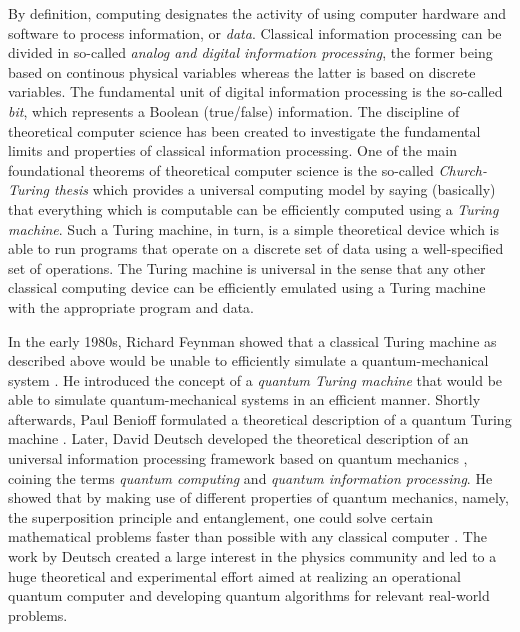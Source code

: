 By definition, computing designates the activity of using computer hardware and software to process information, or {\it data}. Classical information processing can be divided in so-called {\it analog and digital information processing}, the former being based on continous physical variables whereas the latter is based on discrete variables. The fundamental unit of digital information processing is the so-called {\it bit}, which represents a Boolean (true/false) information. The discipline of theoretical computer science has been created to investigate the fundamental limits and properties of classical information processing. One of the main foundational theorems of theoretical computer science is the so-called {\it Church-Turing thesis} which provides a universal computing model by saying (basically) that everything which is computable can be efficiently computed using a {\it Turing machine}. Such a Turing machine, in turn, is a simple theoretical device which is able to run programs that operate on a discrete set of data using a well-specified set of operations. The Turing machine is universal in the sense that any other classical computing device can be efficiently emulated using a Turing machine with the appropriate program and data.

\smallskip

In the early 1980s, Richard Feynman showed that a classical Turing machine as described above would be unable to efficiently simulate a quantum-mechanical system \citep{feynman_simulating_1982}. He introduced the concept of a {\it quantum Turing machine} that would be able to simulate quantum-mechanical systems in an efficient manner. Shortly afterwards, Paul Benioff formulated a theoretical description of a quantum Turing machine \citep{benioff_quantum_1982}. Later, David Deutsch developed the theoretical description of an universal information processing framework based on quantum mechanics \citep{deutsch_quantum_1985}, coining the terms {\it quantum computing} and {\it quantum information processing}. He showed that by making use of different properties of quantum mechanics, namely, the superposition principle and entanglement, one could solve certain mathematical problems faster than possible with any classical computer \citep{deutsch_quantum_1985}. The work by Deutsch created a large interest in the physics community and led to a huge theoretical and experimental effort aimed at realizing an operational quantum computer and developing quantum algorithms for relevant real-world problems.

